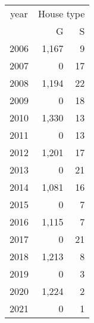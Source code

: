 \footnotesize\begin{tabular}[t]{lrr}
\toprule
\multicolumn{1}{c}{year} & \multicolumn{2}{c}{House type} \\
\cmidrule(l{3pt}r{3pt}){1-1} \cmidrule(l{3pt}r{3pt}){2-3}
  & G & S\\
\midrule
2006 & 1,167 & 9\\
2007 & 0 & 17\\
2008 & 1,194 & 22\\
2009 & 0 & 18\\
2010 & 1,330 & 13\\
2011 & 0 & 13\\
2012 & 1,201 & 17\\
2013 & 0 & 21\\
2014 & 1,081 & 16\\
2015 & 0 & 7\\
2016 & 1,115 & 7\\
2017 & 0 & 21\\
2018 & 1,213 & 8\\
2019 & 0 & 3\\
2020 & 1,224 & 2\\
2021 & 0 & 1\\
\bottomrule
\end{tabular}
